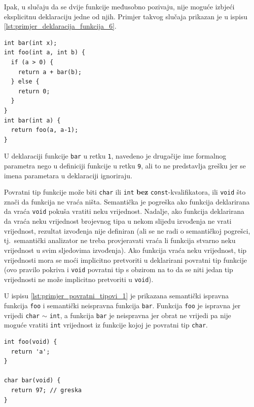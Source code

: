 \documentclass[times, 12pt, utf8]{book}
\begin{document}
Ipak, u slučaju da se dvije funkcije međusobno pozivaju, nije moguće izbjeći eksplicitnu deklaraciju jedne od njih.
Primjer takvog slučaja prikazan je u ispisu \ref{lst:primjer_deklaracija_funkcija_6}.

\begin{lstlisting}[caption={Nužna deklaracija funkcije \texttt{bar} prije definicije funkcije \texttt{foo}.},label=lst:primjer_deklaracija_funkcija_6]
int bar(int x);
int foo(int a, int b) {
  if (a > 0) {
    return a + bar(b);
  } else {
    return 0;
  }
}
int bar(int a) {
  return foo(a, a-1);
}
\end{lstlisting}

U deklaraciji funkcije \verb|bar| u retku \verb|1|, navedeno je drugačije ime formalnog parametra nego u definiciji funkcije u retku \verb|9|, ali to ne predstavlja grešku jer se imena parametara u deklaraciji ignoriraju.

Povratni tip funkcije može biti \verb|char| ili \verb|int| \textbf{bez} \verb|const|-kvalifikatora, ili \verb|void| što znači da funkcija ne vraća ništa.
Semantička je pogreška ako funkcija deklarirana da vraća \verb|void| pokuša vratiti neku vrijednost.
Nadalje, ako funkcija deklarirana da vraća neku vrijednost brojevnog tipa u nekom slijedu izvođenja ne vrati vrijednost, rezultat izvođenja nije definiran (ali se ne radi o semantičkoj pogrešci, tj.~semantički analizator ne treba provjeravati vraća li funkcija stvarno neku vrijednost u svim sljedovima izvođenja).
Ako funkcija vraća neku vrijednost, tip vrijednosti mora se moći implicitno pretvoriti u deklarirani povratni tip funkcije (ovo pravilo pokriva i \verb|void| povratni tip s obzirom na to da se niti jedan tip vrijednosti ne može implicitno pretvoriti u \verb|void|).

U ispisu \ref{lst:primjer_povratni_tipovi_1} je prikazana semantički ispravna funkcija \verb|foo| i semantički neispravna funkcija \verb|bar|.
Funkcija \verb|foo| je ispravna jer vrijedi \verb|char| \(\sim\) \verb|int|, a funkcija \verb|bar| je neispravna jer obrat ne vrijedi pa nije moguće vratiti \verb|int| vrijednost iz funkcije kojoj je povratni tip \verb|char|.

\begin{lstlisting}[caption={Ispravna funkcija \texttt{foo} i neispravna funkcija \texttt{bar}.},label=lst:primjer_povratni_tipovi_1]
int foo(void) {
  return 'a';
}

char bar(void) {
  return 97; // greska
}
\end{lstlisting}
\end{document}
